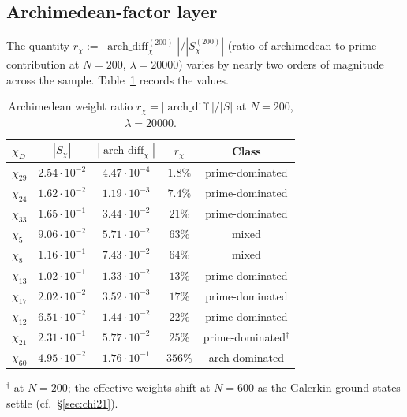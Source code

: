 \documentclass[10pt,twocolumn]{article}
\theoremstyle{definition}
\theoremstyle{remark}
\newcommand{\chifn}{\chi}
\newcommand{\archdiff}{\operatorname{arch\_diff}}
\begin{document}
\subsection{Archimedean-factor layer}
\label{sec:archlayer}

The quantity
$r_{\chifn}:=|\archdiff_{\chifn}^{(200)}|/|S_{\chifn}^{(200)}|$
(ratio of archimedean to prime contribution at $N=200$,
$\lambda=20000$) varies by nearly two orders of magnitude across the
sample. Table~\ref{tab:archratio} records the values.

\begin{table}[t]
\caption{Archimedean weight ratio
  $r_{\chifn}=|\archdiff|/|S|$ at $N=200$, $\lambda=20000$.}
\label{tab:archratio}
\centering\small
\begin{tabular}{@{}lcccc@{}}
\toprule
$\chifn_D$ & $|S_{\chifn}|$ & $|\archdiff_{\chifn}|$ & $r_{\chifn}$ & Class \\
\midrule
$\chifn_{29}$ & $2.54\!\cdot\!10^{-2}$ & $4.47\!\cdot\!10^{-4}$ & $1.8\%$ & prime-dominated \\
$\chifn_{24}$ & $1.62\!\cdot\!10^{-2}$ & $1.19\!\cdot\!10^{-3}$ & $7.4\%$ & prime-dominated \\
$\chifn_{33}$ & $1.65\!\cdot\!10^{-1}$ & $3.44\!\cdot\!10^{-2}$ & $21\%$ & prime-dominated \\
$\chifn_5$ & $9.06\!\cdot\!10^{-2}$ & $5.71\!\cdot\!10^{-2}$ & $63\%$ & mixed \\
$\chifn_8$ & $1.16\!\cdot\!10^{-1}$ & $7.43\!\cdot\!10^{-2}$ & $64\%$ & mixed \\
$\chifn_{13}$ & $1.02\!\cdot\!10^{-1}$ & $1.33\!\cdot\!10^{-2}$ & $13\%$ & prime-dominated \\
$\chifn_{17}$ & $2.02\!\cdot\!10^{-2}$ & $3.52\!\cdot\!10^{-3}$ & $17\%$ & prime-dominated \\
$\chifn_{12}$ & $6.51\!\cdot\!10^{-2}$ & $1.44\!\cdot\!10^{-2}$ & $22\%$ & prime-dominated \\
$\chifn_{21}$ & $2.31\!\cdot\!10^{-1}$ & $5.77\!\cdot\!10^{-2}$ & $25\%$ & prime-dominated$^\dagger$ \\
$\chifn_{60}$ & $4.95\!\cdot\!10^{-2}$ & $1.76\!\cdot\!10^{-1}$ & $356\%$ & arch-dominated \\
\bottomrule
\end{tabular}

\smallskip
\footnotesize
$^\dagger$ at $N=200$; the effective weights shift at $N=600$ as
the Galerkin ground states settle (cf.\ \S\ref{sec:chi21}).
\end{table}
\end{document}
